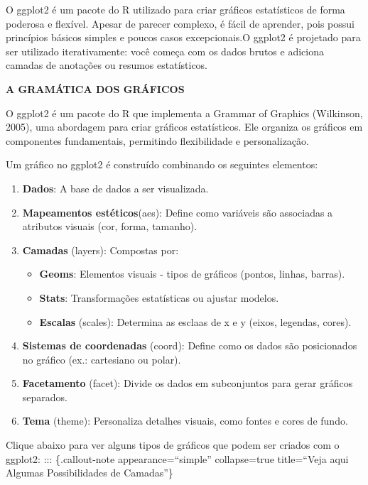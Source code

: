 \documentclass[
  letterpaper,
  DIV=11,
  numbers=noendperiod]{scrreprt}
\providecommand{\tightlist}{%
  \setlength{\itemsep}{0pt}\setlength{\parskip}{0pt}}
\begin{document}
O ggplot2 é um pacote do R utilizado para criar gráficos estatísticos de
forma poderosa e flexível. Apesar de parecer complexo, é fácil de
aprender, pois possui princípios básicos simples e poucos casos
excepcionais.O ggplot2 é projetado para ser utilizado iterativamente:
você começa com os dados brutos e adiciona camadas de anotações ou
resumos estatísticos.

\textbf{A GRAMÁTICA DOS GRÁFICOS}

O ggplot2 é um pacote do R que implementa a Grammar of Graphics
(Wilkinson, 2005), uma abordagem para criar gráficos estatísticos. Ele
organiza os gráficos em componentes fundamentais, permitindo
flexibilidade e personalização.

Um gráfico no ggplot2 é construído combinando os seguintes elementos:

\begin{enumerate}
\def\labelenumi{\arabic{enumi}.}
\tightlist
\item
  \textbf{Dados}: A base de dados a ser visualizada.
\item
  \textbf{Mapeamentos estéticos}(aes): Define como variáveis são
  associadas a atributos visuais (cor, forma, tamanho).
\item
  \textbf{Camadas} (layers): Compostas por:

  \begin{itemize}
  \tightlist
  \item
    \textbf{Geoms}: Elementos visuais - tipos de gráficos (pontos,
    linhas, barras).
  \item
    \textbf{Stats}: Transformações estatísticas ou ajustar modelos.
  \item
    \textbf{Escalas} (scales): Determina as esclaas de x e y (eixos,
    legendas, cores).
  \end{itemize}
\item
  \textbf{Sistemas de coordenadas} (coord): Define como os dados são
  posicionados no gráfico (ex.: cartesiano ou polar).
\item
  \textbf{Facetamento} (facet): Divide os dados em subconjuntos para
  gerar gráficos separados.
\item
  \textbf{Tema} (theme): Personaliza detalhes visuais, como fontes e
  cores de fundo.
\end{enumerate}

Clique abaixo para ver alguns tipos de gráficos que podem ser criados
com o ggplot2: ::: \{.callout-note appearance=``simple'' collapse=true
title=``Veja aqui Algumas Possibilidades de Camadas''\}
\end{document}

